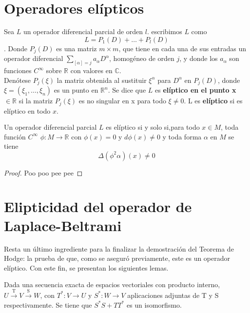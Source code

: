 \section{Operadores elípticos}%
%
\begin{defi}
Sea $L$ un operador diferencial parcial de orden $l$. escribimos $L$ como
\[L = P_1(D) + \ldots + P_l(D)\].
Donde $P_j(D)$ es una matriz $m \times m$, que tiene en cada una de sus entradas un operador diferencial $\sum\limits_{[\alpha] = j}a_\alpha D^\alpha$, homogéneo de orden $j$, y donde los $a_\alpha$ son funciones $C^\infty$ sobre $\mathbb{R}$ con valores en $\mathbb{C}$.\\
Denótese $P_j(\xi)$ la matriz obtenida al sustituir $\xi^\alpha$ para $D^\alpha$ en $P_j(D)$, donde $\xi = (\xi_1, \ldots, \xi_n)$ es un punto en $\mathbb{R}^n$. Se dice que $L$ es \textbf{elíptico en el punto x} $\in \mathbb{R}$ si la matriz $P_j(\xi)$ es no singular en x para todo $\xi \neq 0$. L es \textbf{elíptico} si es elíptico en todo $x$.
\end{defi}


\begin{lem} Un operador diferencial parcial $L$ es elíptico si y solo si,para todo $x \in M$, toda función $C^\infty$ $\phi\colon M \to \mathbb{R}$ con $\phi(x) = 0$ y $d\phi(x) \neq 0$ y toda forma $\alpha$ en $M$ se tiene
\begin{equation}
    \Delta(\phi^2\alpha)(x) \neq 0
\end{equation}
\end{lem}
\begin{proof}
Poo poo pee pee
\end{proof}








%
\section{Elipticidad del operador de Laplace-Beltrami}%

Resta un último ingrediente para la finalizar la demostración del Teorema de Hodge: la prueba de que, como se aseguró previamente, este es un operador elíptico. Con este fin, se presentan los siguientes lemas.\\
\begin{lem}
Dada una secuencia exacta de espacios vectoriales con producto interno, \( U \xrightarrow{\text{T}} V \xrightarrow{\text{S}} W\), con $T^{*}\colon V \to U$ y $S^{*}\colon W \to V$ aplicaciones adjuntas de T y S respectivamente. Se tiene que \(S^{*}S+TT^{*}\) es un isomorfismo.
\end{lem}

